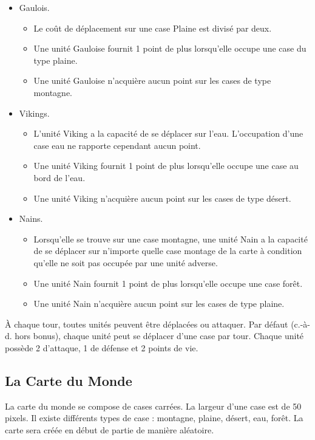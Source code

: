 \documentclass[a4paper]{article}%
\begin{document}
\begin{itemize}

\item Gaulois. \begin{itemize}
\item Le coût de déplacement sur une case Plaine est divisé par deux.
\item Une unité Gauloise fournit 1 point de plus lorsqu’elle occupe une case du type plaine.
\item Une unité Gauloise n’acquière aucun point sur les cases de type montagne.
\end{itemize}
\item Vikings. \begin{itemize}
\item L’unité Viking a la capacité de se déplacer sur l’eau. L’occupation d’une case eau ne rapporte cependant aucun point.
\item Une unité Viking fournit 1 point de plus lorsqu’elle occupe une case au bord de l’eau.
\item Une unité Viking n’acquière aucun point sur les cases de type désert.
\end{itemize}
\item Nains. \begin{itemize}
\item Lorsqu’elle se trouve sur une case montagne, une unité Nain a la capacité de se déplacer sur n’importe quelle case montage de la carte à condition qu’elle ne soit pas occupée par une unité adverse.
\item Une unité Nain fournit 1 point de plus lorsqu’elle occupe une case forêt.
\item Une unité Nain n’acquière aucun point sur les cases de type plaine.
\end{itemize}
\end{itemize}


À chaque tour, toutes unités peuvent être déplacées ou attaquer. Par défaut (c.-à-d. hors bonus), chaque unité peut se déplacer d’une case par tour. Chaque unité possède 2 d’attaque, 1 de défense et 2 points de vie.

\subsection{La Carte du Monde}
La carte du monde se compose de cases carrées. La largeur d’une case est de 50 pixels. Il existe différents types de case : montagne, plaine, désert, eau, forêt. La carte sera créée en début de partie de manière aléatoire.
\end{document}
